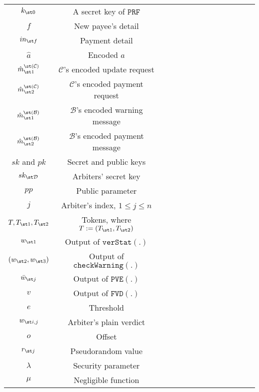 \begin{table*}[!htbp]
\begin{scriptsize}
\begin{center}
{{\begin{tabular}{|c|c|c|c|c|c|c|c|c|c|c|c|c|c|}
 {   }\scriptsize$ k_{\st 0}$ & {   }\scriptsize   A secret key of $\mathtt{PRF}$\\ 
%               
 {    }\scriptsize$f$ & {    }\scriptsize New payee’s detail  \\ 
 {   }\scriptsize$in_{\st f}$ & {   }\scriptsize Payment detail \\ 
%
   {    }\scriptsize$\hat a$ & {    }\scriptsize Encoded $a$ \\     
%
 {   }\scriptsize$\hat {m}^{\st(\mathcal{C})}_{\st 1}$ & {   }\scriptsize $\mathcal{C}$'s encoded update request\\     
%
 {    }\scriptsize$\hat {m}^{\st(\mathcal{C})}_{\st 2}$ & {    }\scriptsize $\mathcal{C}$'s encoded payment request\\     
%      
 {   }\scriptsize$\hat {m}^{\st(\mathcal{B})}_{\st 1}$ & {   }\scriptsize $\mathcal{B}$'s encoded warning message\\     
%
 {    }\scriptsize$\hat {m}^{\st(\mathcal{B})}_{\st 2}$ & {    }\scriptsize $\mathcal{B}$'s encoded payment message\\     
%          
      {   }\scriptsize$sk$ and $pk$ & {   }\scriptsize Secret  and public keys\\     
%
    {    }\scriptsize$sk_{\st\mathcal{D}}$ & {    }\scriptsize Arbiters' secret key\\     
%    
 {   }\scriptsize$pp$ & {   }\scriptsize Public parameter\\  
%
 {    }\scriptsize$j$ & {    }\scriptsize  Arbiter's index,  $1\leq j\leq n$ \\ 
%
 {   }\scriptsize$T, T_{\st 1},T_{\st 2}$ & {   }\scriptsize  Tokens, where  $T:=( T_{\st 1},T_{\st 2})$\\ 
%
 {    }\scriptsize$w_{\st 1}$ & {    }\scriptsize  Output of $\mathtt{verStat}(.)$\\ 
%
 {   }\scriptsize$(w_{\st 2},w_{\st 3})$ & {   }\scriptsize  Output of $\mathtt{checkWarning}(.)$\\ 
%
 {    }\scriptsize$\bar{w}_{\st j}$ & {    }\scriptsize  Output of $\mathtt{PVE}(.)$\\ 
%
 {   }\scriptsize$v$ & {   }\scriptsize  Output of $\mathtt{FVD}(.)$\\ 
%
 {    }\scriptsize$e$ & {    }\scriptsize  Threshold\\ 
%            
  {   }\scriptsize$w_{\st i,j}$ & {   }\scriptsize  Arbiter's plain verdict\\ 
%     
 {    }\scriptsize$o$ & {    }\scriptsize  Offset\\  
   {   }\scriptsize$r_{\st j}$ & {   }\scriptsize  Pseudorandom value\\   
 {    }\scriptsize$\lambda$ & {    }\scriptsize Security parameter\\  
%
 {   }\scriptsize$\mu$ & {   }\scriptsize Negligible function\\  



\end{tabular}}}
\end{center}
\end{scriptsize}
\end{table*}
